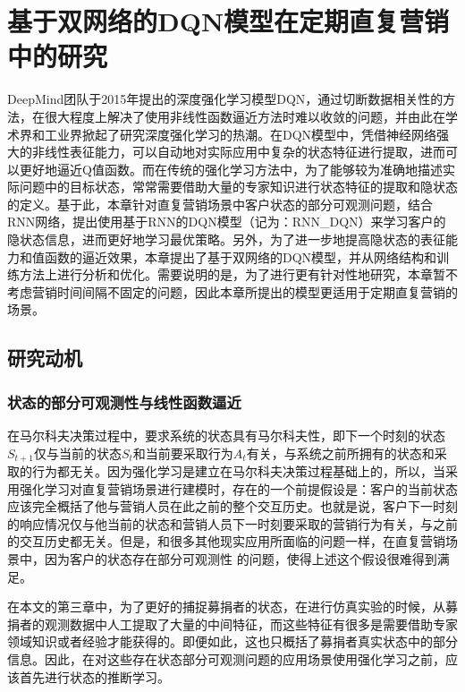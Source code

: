 
\chapter{基于双网络的DQN模型在定期直复营销中的研究}

DeepMind团队于2015年提出的深度强化学习模型DQN，通过切断数据相关性的方法，在很大程度上解决了使用非线性函数逼近方法时难以收敛的问题，并由此在学术界和工业界掀起了研究深度强化学习的热潮。在DQN模型中，凭借神经网络强大的非线性表征能力，可以自动地对实际应用中复杂的状态特征进行提取，进而可以更好地逼近Q值函数。而在传统的强化学习方法中，为了能够较为准确地描述实际问题中的目标状态，常常需要借助大量的专家知识进行状态特征的提取和隐状态的定义。基于此，本章针对直复营销场景中客户状态的部分可观测问题，结合RNN网络，提出使用基于RNN的DQN模型（记为：RNN_DQN）来学习客户的隐状态信息，进而更好地学习最优策略。另外，为了进一步地提高隐状态的表征能力和值函数的逼近效果，本章提出了基于双网络的DQN模型，并从网络结构和训练方法上进行分析和优化。需要说明的是，为了进行更有针对性地研究，本章暂不考虑营销时间间隔不固定的问题，因此本章所提出的模型更适用于定期直复营销的场景。

\section{研究动机}
\subsection{状态的部分可观测性与线性函数逼近}
在马尔科夫决策过程中，要求系统的状态具有马尔科夫性，即下一个时刻的状态$S_{t+1}$仅与当前的状态$S_{t}$和当前要采取行为$A_{t}$有关，与系统之前所拥有的状态和采取的行为都无关\citep{2016面向强化学习的模型学习算法研究}。因为强化学习是建立在马尔科夫决策过程基础上的，所以，当采用强化学习对直复营销场景进行建模时，存在的一个前提假设是：客户的当前状态应该完全概括了他与营销人员在此之前的整个交互历史。也就是说，客户下一时刻的响应情况仅与他当前的状态和营销人员下一时刻要采取的营销行为有关，与之前的交互历史都无关。但是，和很多其他现实应用所面临的问题一样，在直复营销场景中，因为客户的状态存在部分可观测性
的问题，使得上述这个假设很难得到满足。

在本文的第三章中，为了更好的捕捉募捐者的状态，在进行仿真实验的时候，从募捐者的观测数据中人工提取了大量的中间特征，而这些特征有很多是需要借助专家领域知识或者经验才能获得的。即便如此，这也只概括了募捐者真实状态中的部分信息。因此，在对这些存在状态部分可观测问题的应用场景使用强化学习之前，应该首先进行状态的推断学习。

